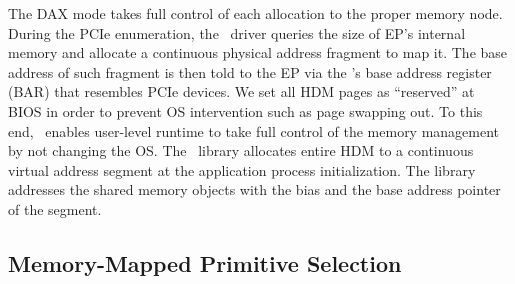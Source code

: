 \ifx\undefined\stale
The DAX mode takes full control of each allocation to the proper memory node. During the PCIe enumeration, the \name~driver queries the size of EP's internal memory and allocate a continuous physical address fragment to map it. The base address of such fragment is then told to the EP via the \cxlio's base address register (BAR) that resembles PCIe devices. 
We set all HDM pages as ``reserved'' at BIOS in order to prevent OS intervention such as page swapping out. To this end, \name~enables user-level runtime to take full control of the memory management by not changing the OS. 
The \name~library allocates entire HDM to a continuous virtual address segment at the application process initialization. The library addresses the shared memory objects with the bias and the base address pointer of the segment. 
\fi





\subsection{Memory-Mapped Primitive Selection}  \label{subsec:memory_mapping}




